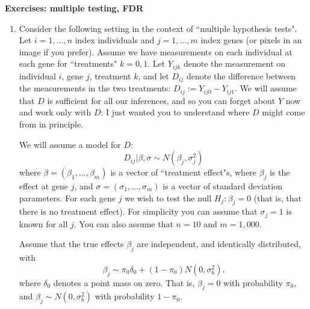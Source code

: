 \documentclass[12pt]{article}
\begin{document}
\begin{center}
{\bf
Exercises: multiple testing, FDR}
\smallskip

\end{center}

\bigskip

\begin{enumerate}
\item Consider the following setting in the context of ``multiple hypothesis tests".
Let $i=1,\dots,n$ index individuals and $j=1,\dots,m$ index genes (or pixels in an image if you prefer). Assume we have
measurements on each individual at each gene for ``treatments" $k=0,1$. Let $Y_{ijk}$ denote the
measurement on individual $i$, gene $j$, treatment $k$, and let $D_{ij}$ denote the difference between the measurements
in the two treatments: $D_{ij}:= Y_{ij0}-Y_{ij1}$. We will assume that $D$ is sufficient for all our inferences, and so you can forget about $Y$ now and work
only with $D$: I just wanted you to understand where $D$ might come from in principle.

We will assume a model for $D$:
\begin{equation} \label{eqn:D}
D_{ij} | \beta, \sigma \sim N(\beta_j, \sigma_j^2)
\end{equation}
where $\beta=(\beta_1,\dots,\beta_m)$ is a vector of ``treatment effect"s, where
$\beta_j$ is the effect at gene $j$, and $\sigma=(\sigma_1,\dots,\sigma_m)$ is a vector of 
standard deviation parameters. 
For each gene $j$ we wish to test
the null $H_j: \beta_j=0$ (that is, that there is no treatment effect). For simplicity you can assume that $\sigma_j=1$ is known for all $j$. You can also assume that $n=10$ and $m=1,000$.

Assume that the true effects
$\beta_j$ are independent, and identically distributed, with 
\begin{equation} \label{eqn:B}
\beta_j \sim \pi_0 \delta_0 + (1-\pi_0) N(0,\sigma^2_b).
\end{equation}
where $\delta_0$ denotes a point mass on zero.
That is, $\beta_j=0$ with probability $\pi_0$, and $\beta_j\sim  N(0,\sigma^2_b)$ with probability $1-\pi_0$.


\end{enumerate}
\end{document}
